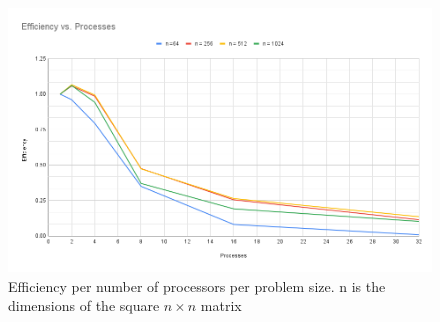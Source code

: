 \documentclass[12pt,letterpaper]{article}
\begin{document}
\begin{figure}[!htb]
    \centering
    \includegraphics[width=0.9\linewidth]{"Efficiency vs. Processes"}
    \caption{Efficiency per number of processors per problem size. n is the dimensions of the square \(n \times n\) matrix}
    \label{fig:efficiency-mpi}
\end{figure}
\end{document}
